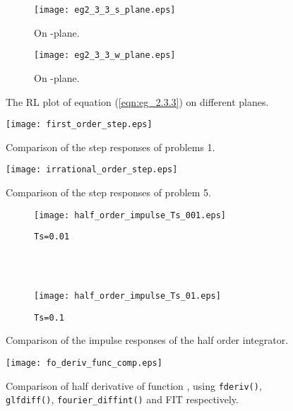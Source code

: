 \documentclass[11pt]{tCON2e}
\theoremstyle{plain}\newtheorem{theorem}{Theorem}
\theoremstyle{definition}
\theoremstyle{remark}
\begin{document}
\begin{figure}[h!]
\centering
    \begin{subfigure}[b]{0.49\textwidth}
        \texttt{[image: eg2\_3\_3\_s\_plane.eps]}
        \caption{On -plane.}
        \label{fig:eg2_3_3_a}
    \end{subfigure}
    \begin{subfigure}[b]{0.49\textwidth}
        \texttt{[image: eg2\_3\_3\_w\_plane.eps]}
        \caption{On -plane.}
        \label{fig:eg2_3_3_b}
    \end{subfigure}\caption{The RL plot of equation (\ref{eqn:eg_2.3.3}) on different planes.}
    \label{fig:eg2_3_3}
\end{figure}







\begin{figure}[h]
\centering
\texttt{[image: first\_order\_step.eps]}
\caption{Comparison of the step responses of problems 1.}
\label{fig:first_order_step}
\end{figure}

\begin{figure}[h]
\centering
\texttt{[image: irrational\_order\_step.eps]}
\caption{Comparison of the step responses of problem 5.}
\label{fig:irrational_order_step}
\end{figure}



\begin{figure}[h]
\centering
    \begin{subfigure}[b]{0.75\textwidth}
        \texttt{[image: half\_order\_impulse\_Ts\_001.eps]}
        \caption{{\tt Ts=0.01}}
        \label{fig:half_order_impulse_Ts_0.01}
    \end{subfigure}\\~~ \begin{subfigure}[b]{0.75\textwidth}
        \texttt{[image: half\_order\_impulse\_Ts\_01.eps]}
        \caption{{\tt Ts=0.1}}
        \label{fig:half_order_impulse_Ts_0.1}
    \end{subfigure}\caption{Comparison of the impulse responses of the half order integrator.}
    \label{fig:half_order_impulse}
\end{figure}

\begin{figure}[h]
\centering
\texttt{[image: fo\_deriv\_func\_comp.eps]}
\caption[Comparison of half derivative of function ]{Comparison of half derivative of function , using {\tt fderiv()}, {\tt glfdiff()}, {\tt fourier\_diffint()} and FIT respectively.}
\label{fig:fo_deriv_func_comp}
\end{figure}
\end{document}
